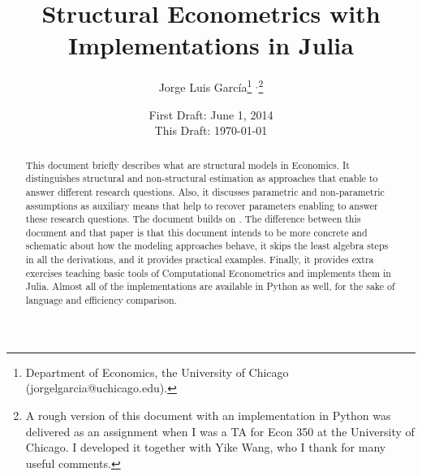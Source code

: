 



\title{\textbf{Structural Econometrics with Implementations in Julia}}
\author{Jorge Luis Garc\'{i}a\thanks{Department of Economics, the University of Chicago (jorgelgarcia@uchicago.edu).} $^{,}$\thanks{A rough version of this document with an implementation in Python was delivered as an assignment when I was a TA for Econ 350 at the University of Chicago. I developed it together with Yike Wang, who I thank for many useful comments.}}
\date{First Draft: June 1, 2014 \\ This Draft: \today}
\maketitle

\begin{abstract}
\noindent This document briefly describes what are structural models in Economics. It distinguishes structural and non-structural estimation as approaches that enable to answer different research questions. Also, it discusses parametric and non-parametric assumptions as auxiliary means that help to recover parameters enabling to answer these research questions. The document builds on \citet{keane2011structural}. The difference between this document and that paper is that this document intends to be more concrete and schematic about how the modeling approaches behave, it skips the least algebra steps in all the derivations, and it provides practical examples. Finally, it provides extra exercises teaching basic tools of Computational Econometrics and implements them in Julia. Almost all of the implementations are available in Python as well, for the sake of language and efficiency comparison.
\end{abstract}





\clearpage


\clearpage









